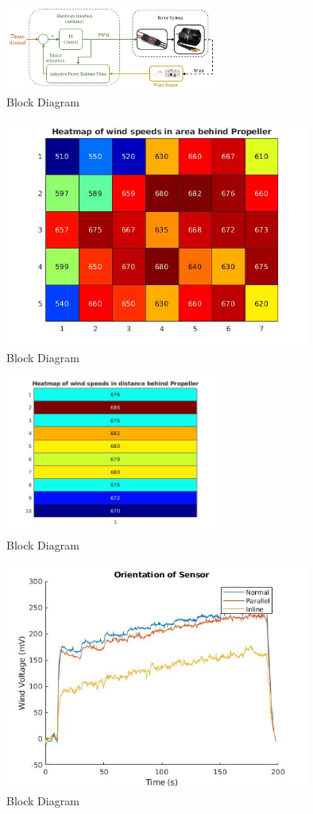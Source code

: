 \documentclass[conference]{IEEEtran}
\begin{document}
\subsection{}
	\begin{figure}[htbp]
	\includegraphics[width=7cm]{images/Figure_2/Block Diagram.jpg}
	\caption{Block Diagram}
	\label{block_diagram}
	\end{figure}
	\begin{figure}[htbp]
	\includegraphics[width=10cm]{images/figure_1/area_heatmap.jpg}
	\caption{Block Diagram}
	\label{area}
	\end{figure}
	\begin{figure}[htbp]
	\includegraphics[width = 7cm]{images/figure_1/dist_heatmap.jpg}
	\caption{Block Diagram}
	\label{dist}
\end{figure}
	\begin{figure}[htbp]
	\includegraphics[width=10cm]{images/figure_1/orientation.jpg}
	\caption{Block Diagram}
	\label{orientation}
\end{figure}
\end{document}
